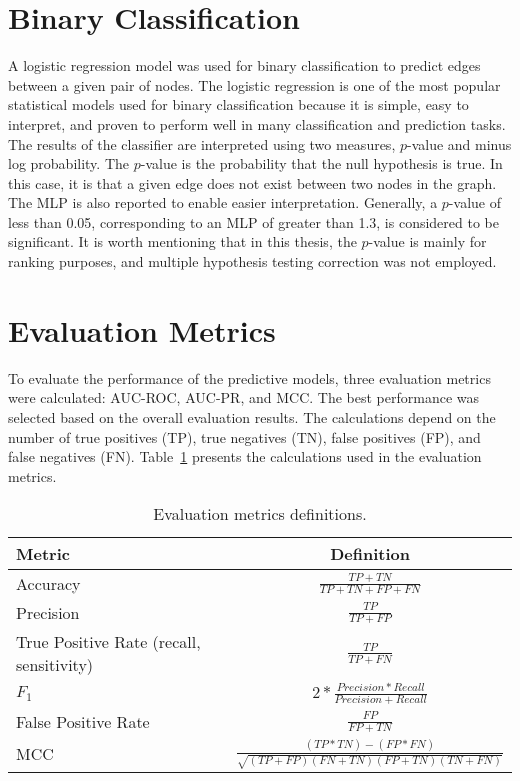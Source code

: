 \section{Binary Classification}

A logistic regression model was used for binary classification to predict edges between a given pair of nodes.
The logistic regression is one of the most popular statistical models used for binary classification because it is simple, easy to interpret, and proven to perform well in many classification and prediction tasks.
The results of the classifier are interpreted using two measures, $p$-value and minus log probability.
The $p$-value is the probability that the null hypothesis is true.
In this case, it is that a given edge does not exist between two nodes in the graph.
The \ac{MLP} is also reported to enable easier interpretation.
Generally, a $p$-value of less than 0.05, corresponding to an \ac{MLP} of greater than 1.3, is considered to be significant.
It is worth mentioning that in this thesis, the $p$-value is mainly for ranking purposes, and multiple hypothesis testing correction was not employed.

\section{Evaluation Metrics}\label{evaluation_section}

To evaluate the performance of the predictive models, three evaluation metrics were calculated: \ac{AUC-ROC}, \ac{AUC-PR}, and \ac{MCC}.
The best performance was selected based on the overall evaluation results.
The calculations depend on the number of true positives (TP), true negatives (TN), false positives (FP), and false negatives (FN).
Table~\ref{tab:evaluation} presents the calculations used in the evaluation metrics.

\begin{table}[ht]
    \centering
    \begin{tabular}{ |l|c| }
        \hline
        \textbf{Metric} & \textbf{Definition} \\
        \hline
        Accuracy & $\frac{TP + TN}{TP + TN + FP + FN}$ \\
        \hline
        Precision & $\frac{TP}{TP + FP}$ \\
        \hline
        True Positive Rate (recall, sensitivity) & $\frac{TP}{TP + FN}$ \\
        \hline
        $F_{1}$ & $2 * \frac{Precision * Recall}{Precision + Recall}$ \\
        \hline
        False Positive Rate & $\frac{FP}{FP + TN}$ \\
        \hline
        MCC & $\frac{(TP*TN)-(FP*FN)}{\sqrt{(TP + FP)(FN + TN)(FP + TN)(TN + FN)}}$ \\
        \hline
    \end{tabular}
    \caption{Evaluation metrics definitions.}
    \label{tab:evaluation}
\end{table}

